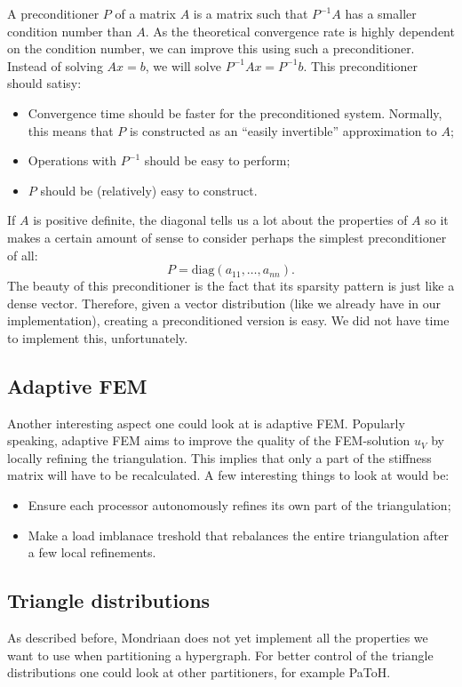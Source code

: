 \documentclass[11pt]{amsart}
\theoremstyle{definition}
\begin{document}
A preconditioner $P$ of a matrix $A$ is a matrix such that $P^{-1}A$ has a smaller condition number than $A$. As the theoretical convergence rate is highly dependent on the condition number, we can improve this using such a preconditioner. Instead of solving $Ax = b$, we will solve $P^{-1}Ax = P^{-1}b$. This preconditioner should satisy:
\begin{itemize}
  \item Convergence time should be faster for the preconditioned system. Normally, this means that $P$ is constructed as an ``easily invertible'' approximation to $A$;
  \item Operations with $P^{-1}$ should be easy to perform;
  \item $P$ should be (relatively) easy to construct.
\end{itemize}

If $A$ is positive definite, the diagonal tells us a lot about the properties of $A$ so it makes a certain amount of sense to consider perhaps the simplest preconditioner of all:
\[
  P = \text{diag}(a_{11}, \ldots, a_{nn}).
\]
The beauty of this preconditioner is the fact that its sparsity pattern is just like a dense vector. Therefore, given a vector distribution (like we already have in our implementation), creating a preconditioned version is easy. We did not have time to implement this, unfortunately.

\subsection{Adaptive FEM}
Another interesting aspect one could look at is adaptive FEM.
Popularly speaking, adaptive FEM aims to improve the quality of the FEM-solution $u_V$ by locally refining the triangulation. This implies that only a part of the stiffness matrix will have to be recalculated. A few interesting things to look at would be:
\begin{itemize}
	\item Ensure each processor autonomously refines its own part of the triangulation;
	\item Make a load imblanace treshold that rebalances the entire triangulation after a few local refinements.
\end{itemize}
\subsection{Triangle distributions}
As described before, Mondriaan does not yet implement all the properties we want to use when partitioning a hypergraph. For better control of the triangle distributions one could look at other partitioners, for example PaToH. \cite{patoh}


\end{document}
